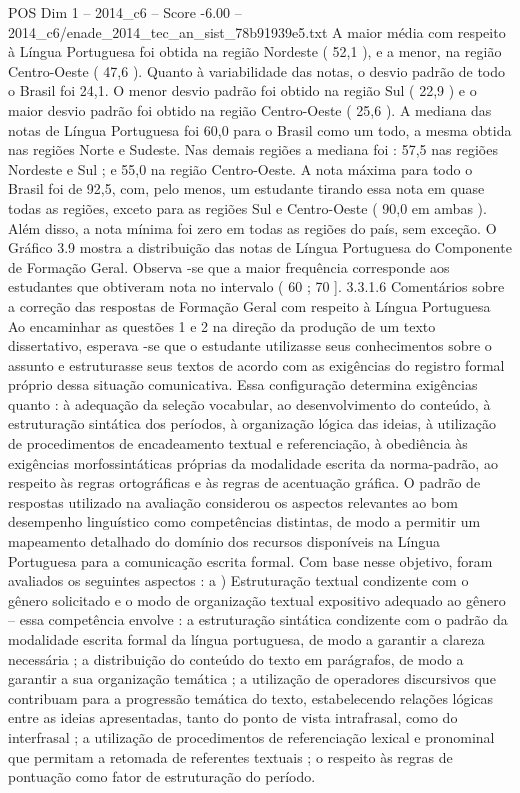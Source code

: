 \begin{textsample}{POS Dim 1 – 2014\_c6 – Score -6.00 – 2014\_c6/enade\_2014\_tec\_an\_sist\_78b91939e5.txt}
A maior média com respeito à Língua Portuguesa foi obtida na região Nordeste ( 52,1 ), e a menor, na região Centro-Oeste ( 47,6 ).
Quanto à variabilidade das notas, o desvio padrão de todo o Brasil foi 24,1.
O menor desvio padrão foi obtido na região Sul ( 22,9 ) e o maior desvio padrão foi obtido na região Centro-Oeste ( 25,6 ).
A mediana das notas de Língua Portuguesa foi 60,0 para o Brasil como um todo, a mesma obtida nas regiões Norte e Sudeste.
Nas demais regiões a mediana foi : 57,5 nas regiões Nordeste e Sul ; e 55,0 na região Centro-Oeste.
A nota máxima para todo o Brasil foi de 92,5, com, pelo menos, um estudante tirando essa nota em quase todas as regiões, exceto para as regiões Sul e Centro-Oeste ( 90,0 em ambas ).
Além disso, a nota mínima foi zero em todas as regiões do país, sem exceção.
O Gráfico 3.9 mostra a distribuição das notas de Língua Portuguesa do Componente de Formação Geral.
Observa -se que a maior frequência corresponde aos estudantes que obtiveram nota no intervalo ( 60 ; 70 ]. 3.3.1.6 Comentários sobre a correção das respostas de Formação Geral com respeito à Língua Portuguesa Ao encaminhar as questões 1 e 2 na direção da produção de um texto dissertativo, esperava -se que o estudante utilizasse seus conhecimentos sobre o assunto e estruturasse seus textos de acordo com as exigências do registro formal próprio dessa situação comunicativa.
Essa configuração determina exigências quanto : à adequação da seleção vocabular, ao desenvolvimento do conteúdo, à estruturação sintática dos períodos, à organização lógica das ideias, à utilização de procedimentos de encadeamento textual e referenciação, à obediência às exigências morfossintáticas próprias da modalidade escrita da norma-padrão, ao respeito às regras ortográficas e às regras de acentuação gráfica.
O padrão de respostas utilizado na avaliação considerou os aspectos relevantes ao bom desempenho linguístico como competências distintas, de modo a permitir um mapeamento detalhado do domínio dos recursos disponíveis na Língua Portuguesa para a comunicação escrita formal.
Com base nesse objetivo, foram avaliados os seguintes aspectos : a ) Estruturação textual condizente com o gênero solicitado e o modo de organização textual expositivo adequado ao gênero – essa competência envolve : a estruturação sintática condizente com o padrão da modalidade escrita formal da língua portuguesa, de modo a garantir a clareza necessária ; a distribuição do conteúdo do texto em parágrafos, de modo a garantir a sua organização temática ; a utilização de operadores discursivos que contribuam para a progressão temática do texto, estabelecendo relações lógicas entre as ideias apresentadas, tanto do ponto de vista intrafrasal, como do interfrasal ; a utilização de procedimentos de referenciação lexical e pronominal que permitam a retomada de referentes textuais ; o respeito às regras de pontuação como fator de estruturação do período.

\end{textsample}
